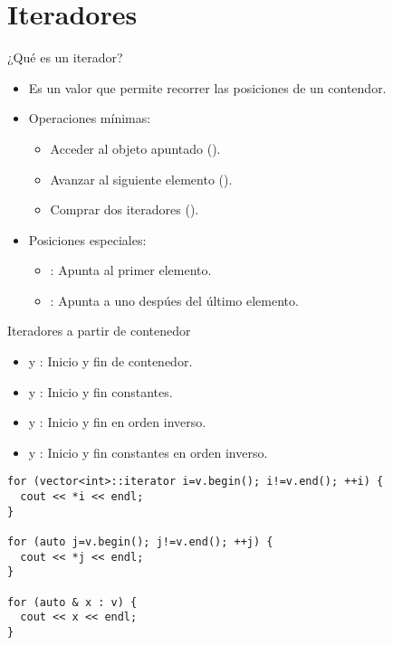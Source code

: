 \section{Iteradores}

\begin{frame}[t]{¿Qué es un iterador?}
\begin{itemize}
  \item Es un valor que permite recorrer las posiciones de un contendor.
  
  \vfill
  \item Operaciones mínimas:
    \begin{itemize}
      \item Acceder al objeto apuntado ().
      \item Avanzar al siguiente elemento ().
      \item Comprar dos iteradores ().
    \end{itemize}

  \vfill
  \item Posiciones especiales:
    \begin{itemize}
      \item {}: Apunta al primer elemento.
      \item {}: Apunta a uno despúes del último elemento.
    \end{itemize}
\end{itemize}
\end{frame}

\begin{frame}[t,fragile]{Iteradores a partir de contenedor}
\begin{itemize}
  \item {} y : Inicio y fin de contenedor.
  \item {} y : Inicio y fin constantes.
  \item {} y : Inicio y fin en orden inverso.
  \item {} y : Inicio y fin constantes en orden inverso.
\end{itemize}
\vfill\pause
\begin{lstlisting}
for (vector<int>::iterator i=v.begin(); i!=v.end(); ++i) {
  cout << *i << endl;
}

for (auto j=v.begin(); j!=v.end(); ++j) {
  cout << *j << endl;
}

for (auto & x : v) {
  cout << x << endl;
}
\end{lstlisting}
\end{frame}
